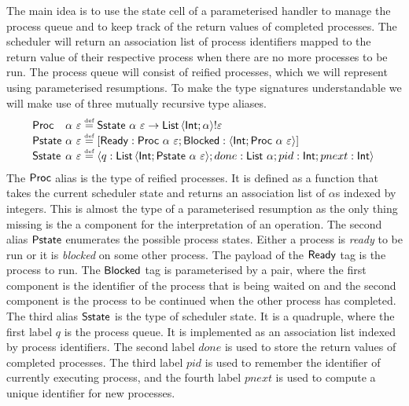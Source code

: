 \documentclass[12pt,phd,lfcs,twoside,openright,logo,leftchapter,normalheadings]{infthesis}
\theoremstyle{plain}
\theoremstyle{definition}
\begin{document}
The main idea is to use the state cell of a parameterised handler to
manage the process queue and to keep track of the return values of
completed processes. The scheduler will return an association list of
process identifiers mapped to the return value of their respective
process when there are no more processes to be run. The process queue
will consist of reified processes, which we will represent using
parameterised resumptions. To make the type signatures understandable
we will make use of three mutually recursive type aliases.
%
\[
  \ba{@{~}l@{~}l@{~}c@{~}l}
    \Proc   &\alpha~\varepsilon   &\defas& \Sstate~\alpha~\varepsilon \to \List\,\Record{\Int;\alpha} \eff \varepsilon\\
    \Pstate &\alpha~\varepsilon &\defas& [\Ready:\Proc~\alpha~\varepsilon;\Blocked:\Record{\Int;\Proc~\alpha~\varepsilon}]\\
    \Sstate &\alpha~\varepsilon &\defas& \Record{q:\List\,\Record{\Int;\Pstate~\alpha~\varepsilon};done:\List~\alpha;pid:\Int;pnext:\Int}\\
  \ea
\]
%
The $\mathsf{Proc}$ alias is the type of reified processes. It is defined as a
function that takes the current scheduler state and returns an
association list of $\alpha$s indexed by integers. This is almost the
type of a parameterised resumption as the only thing missing is the a
component for the interpretation of an operation.
%
The second alias $\mathsf{Pstate}$ enumerates the possible process
states. Either a process is \emph{ready} to be run or it is
\emph{blocked} on some other process. The payload of the $\mathsf{Ready}$ tag
is the process to run. The $\mathsf{Blocked}$ tag is parameterised by a pair,
where the first component is the identifier of the process that is
being waited on and the second component is the process to be
continued when the other process has completed.
%
The third alias $\mathsf{Sstate}$ is the type of scheduler state. It is a
quadruple, where the first label $q$ is the process queue. It is
implemented as an association list indexed by process identifiers. The
second label $done$ is used to store the return values of completed
processes. The third label $pid$ is used to remember the identifier of
currently executing process, and the fourth label $pnext$ is used to
compute a unique identifier for new processes.
\end{document}
